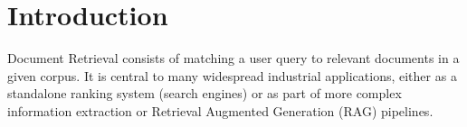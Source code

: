 \documentclass{article} %
\begin{document}
\begin{abstract}

\end{abstract}





\section{Introduction}




Document Retrieval consists of matching a user query to relevant documents in a given corpus. It is central to many widespread industrial applications, either as a standalone ranking system (search engines) or as part of more complex information extraction or Retrieval Augmented Generation (RAG) pipelines.



\end{document}
